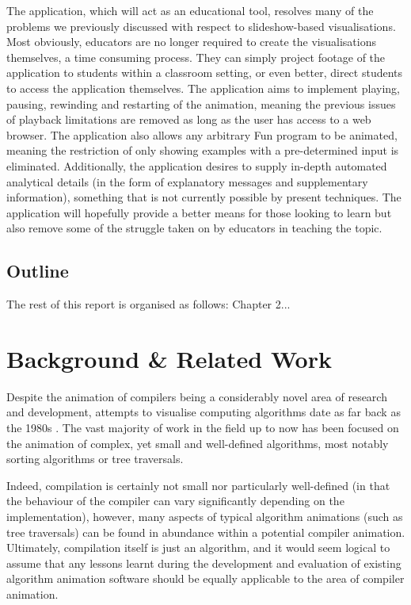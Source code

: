 \documentclass{l4proj}
\begin{document}
The application, which will act as an educational tool, resolves many of the problems we previously discussed with respect to slideshow-based visualisations. Most obviously, educators are no longer required to create the visualisations themselves, a time consuming process. They can simply project footage of the application to students within a classroom setting, or even better, direct students to access the application themselves. The application aims to implement playing, pausing, rewinding and restarting of the animation, meaning the previous issues of playback limitations are removed as long as the user has access to a web browser. The application also allows any arbitrary Fun program to be animated, meaning the restriction of only showing examples with a pre-determined input is eliminated. Additionally, the application desires to supply in-depth automated analytical details (in the form of explanatory messages and supplementary information), something that is not currently possible by present techniques. The application will hopefully provide a better means for those looking to learn but also remove some of the struggle taken on by educators in teaching the topic.

\section{Outline}
The rest of this report is organised as follows: Chapter 2...

\chapter{Background \& Related Work}
Despite the animation of compilers being a considerably novel area of research and development, attempts to visualise computing algorithms date as far back as the 1980s \cite{BentleyKernighan}. The vast majority of work in the field up to now has been focused on the animation of complex, yet small and well-defined algorithms, most notably sorting algorithms or tree traversals.

Indeed, compilation is certainly not small nor particularly well-defined (in that the behaviour of the compiler can vary significantly depending on the implementation), however, many aspects of typical algorithm animations (such as tree traversals) can be found in abundance within a potential compiler animation. Ultimately, compilation itself is just an algorithm,  and it would seem logical to assume that any lessons learnt during the development and evaluation of existing algorithm animation software should be equally applicable to the area of compiler animation. 
\end{document}
